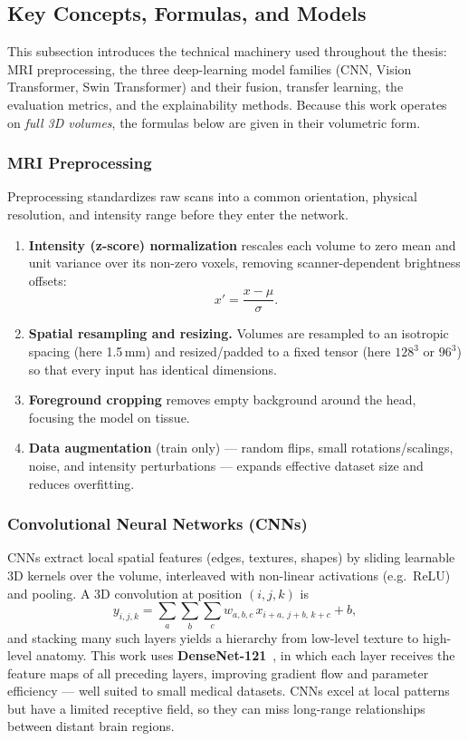 \subsection{Key Concepts, Formulas, and Models}\label{subsec:concepts}
This subsection introduces the technical machinery used throughout the thesis: MRI preprocessing, the three deep-learning model families (CNN, Vision Transformer, Swin Transformer) and their fusion, transfer learning, the evaluation metrics, and the explainability methods. Because this work operates on \emph{full 3D volumes}, the formulas below are given in their volumetric form.

\subsubsection{MRI Preprocessing}
Preprocessing standardizes raw scans into a common orientation, physical resolution, and intensity range before they enter the network.
\begin{enumerate}
    \item \textbf{Intensity (z-score) normalization} rescales each volume to zero mean and unit variance over its non-zero voxels, removing scanner-dependent brightness offsets:
    \[x' = \frac{x - \mu}{\sigma}.\]
    \item \textbf{Spatial resampling and resizing.} Volumes are resampled to an isotropic spacing (here 1.5\,mm) and resized/padded to a fixed tensor (here $128^3$ or $96^3$) so that every input has identical dimensions.
    \item \textbf{Foreground cropping} removes empty background around the head, focusing the model on tissue.
    \item \textbf{Data augmentation} (train only) --- random flips, small rotations/scalings, noise, and intensity perturbations --- expands effective dataset size and reduces overfitting.
\end{enumerate}

\subsubsection{Convolutional Neural Networks (CNNs)}
CNNs extract local spatial features (edges, textures, shapes) by sliding learnable 3D kernels over the volume, interleaved with non-linear activations (e.g.\ ReLU) and pooling. A 3D convolution at position $(i,j,k)$ is
\[
y_{i,j,k} = \sum_{a}\sum_{b}\sum_{c} w_{a,b,c}\, x_{i+a,\,j+b,\,k+c} + b,
\]
and stacking many such layers yields a hierarchy from low-level texture to high-level anatomy. This work uses \textbf{DenseNet-121}~\cite{huang2017densely}, in which each layer receives the feature maps of all preceding layers, improving gradient flow and parameter efficiency --- well suited to small medical datasets. CNNs excel at local patterns but have a limited receptive field, so they can miss long-range relationships between distant brain regions.

